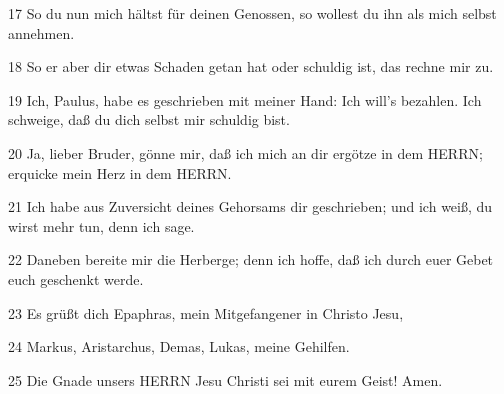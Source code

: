 \par 17 So du nun mich hältst für deinen Genossen, so wollest du ihn als mich selbst annehmen.
\par 18 So er aber dir etwas Schaden getan hat oder schuldig ist, das rechne mir zu.
\par 19 Ich, Paulus, habe es geschrieben mit meiner Hand: Ich will's bezahlen. Ich schweige, daß du dich selbst mir schuldig bist.
\par 20 Ja, lieber Bruder, gönne mir, daß ich mich an dir ergötze in dem HERRN; erquicke mein Herz in dem HERRN.
\par 21 Ich habe aus Zuversicht deines Gehorsams dir geschrieben; und ich weiß, du wirst mehr tun, denn ich sage.
\par 22 Daneben bereite mir die Herberge; denn ich hoffe, daß ich durch euer Gebet euch geschenkt werde.
\par 23 Es grüßt dich Epaphras, mein Mitgefangener in Christo Jesu,
\par 24 Markus, Aristarchus, Demas, Lukas, meine Gehilfen.
\par 25 Die Gnade unsers HERRN Jesu Christi sei mit eurem Geist! Amen.


